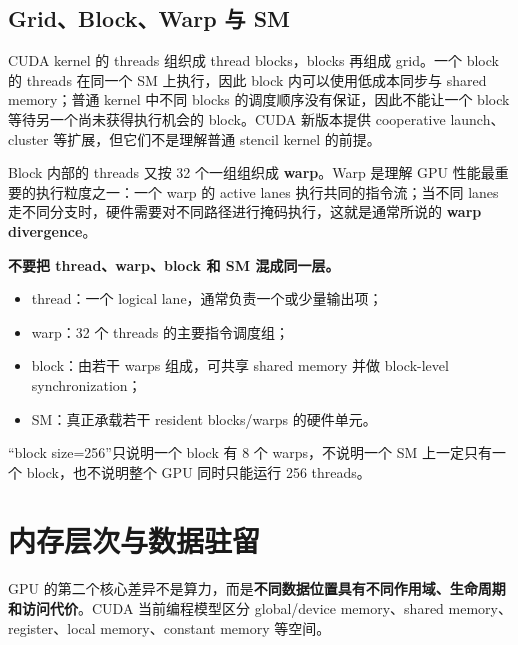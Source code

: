 \subsection{Grid、Block、Warp 与 SM}

CUDA kernel 的 threads 组织成 thread blocks，blocks 再组成 grid。一个 block 的 threads 在同一个 SM 上执行，因此 block 内可以使用低成本同步与 shared memory；普通 kernel 中不同 blocks 的调度顺序没有保证，因此不能让一个 block 等待另一个尚未获得执行机会的 block。CUDA 新版本提供 cooperative launch、cluster 等扩展，但它们不是理解普通 stencil kernel 的前提\cite{cudaProgramming2026}。

Block 内部的 threads 又按 32 个一组组织成 \textbf{warp}。Warp 是理解 GPU 性能最重要的执行粒度之一：一个 warp 的 active lanes 执行共同的指令流；当不同 lanes 走不同分支时，硬件需要对不同路径进行掩码执行，这就是通常所说的 \textbf{warp divergence}\cite{cudaProgramming2026}。

\begin{warningbox}
\textbf{不要把 thread、warp、block 和 SM 混成同一层。}
\begin{itemize}
\item thread：一个 logical lane，通常负责一个或少量输出项；
\item warp：32 个 threads 的主要指令调度组；
\item block：由若干 warps 组成，可共享 shared memory 并做 block-level synchronization；
\item SM：真正承载若干 resident blocks/warps 的硬件单元。
\end{itemize}
“block size=256”只说明一个 block 有 8 个 warps，不说明一个 SM 上一定只有一个 block，也不说明整个 GPU 同时只能运行 256 threads。
\end{warningbox}

\section{内存层次与数据驻留}
\label{sec:gpu-memory-hierarchy}

GPU 的第二个核心差异不是算力，而是\textbf{不同数据位置具有不同作用域、生命周期和访问代价}。CUDA 当前编程模型区分 global/device memory、shared memory、register、local memory、constant memory 等空间\cite{cudaProgramming2026}。


